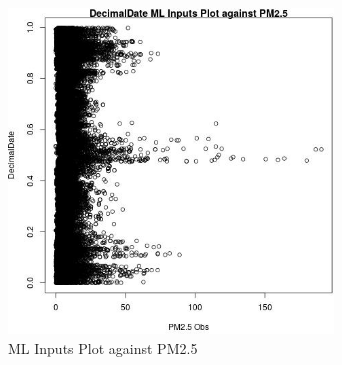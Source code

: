 \begin{figure} 
\centering  
\includegraphics[width=0.77\textwidth]{Code_Outputs/Report_ML_input_PM25_Step4_part_e_de_duplicated_aves_DecimalDatevPM25_Obs.jpg} 
\caption{\label{fig:Report_ML_input_PM25_Step4_part_e_de_duplicated_avesDecimalDatevPM25_Obs}ML Inputs Plot against PM2.5} 
\end{figure} 
 

